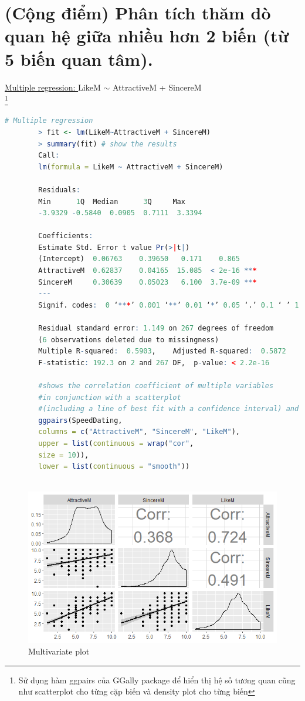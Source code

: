 \documentclass[a4paper,12pt]{article}
\begin{document}
	\section{(Cộng điểm) Phân tích thăm dò quan hệ giữa nhiều hơn 2 biến (từ 5 biến quan tâm).}
	\underline{Multiple regression: }LikeM $\sim$ AttractiveM + SincereM\\
	\footnote{Sử dụng hàm ggpairs của GGally package để hiển thị hệ số tương quan cũng như scatterplot cho từng cặp biến và density plot cho từng biến}
	\begin{lstlisting}[language = R]
		# Multiple regression
		> fit <- lm(LikeM~AttractiveM + SincereM)
		> summary(fit) # show the results
		Call:
		lm(formula = LikeM ~ AttractiveM + SincereM)
		
		Residuals:
		Min      1Q  Median      3Q     Max 
		-3.9329 -0.5840  0.0905  0.7111  3.3394
		
		Coefficients:
		Estimate Std. Error t value Pr(>|t|)    
		(Intercept)  0.06763    0.39650   0.171    0.865    
		AttractiveM  0.62837    0.04165  15.085  < 2e-16 ***
		SincereM     0.30639    0.05023   6.100  3.7e-09 ***
		---
		Signif. codes:  0 ‘***’ 0.001 ‘**’ 0.01 ‘*’ 0.05 ‘.’ 0.1 ‘ ’ 1
		
		Residual standard error: 1.149 on 267 degrees of freedom
		(6 observations deleted due to missingness)
		Multiple R-squared:  0.5903,	Adjusted R-squared:  0.5872 
		F-statistic: 192.3 on 2 and 267 DF,  p-value: < 2.2e-16
		
		#shows the correlation coefficient of multiple variables 
		#in conjunction with a scatterplot 
		#(including a line of best fit with a confidence interval) and a density plot.
		ggpairs(SpeedDating, 
		columns = c("AttractiveM", "SincereM", "LikeM"), 
		upper = list(continuous = wrap("cor", 
		size = 10)), 
		lower = list(continuous = "smooth"))
		
	\end{lstlisting}
	
	\begin{figure}[H]
		\centering
		\includegraphics[width=1.0\linewidth]{Images/Rplot_3v}
		\caption{Multivariate plot}
		\label{fig:rplot3v}
	\end{figure}
	
\end{document}
